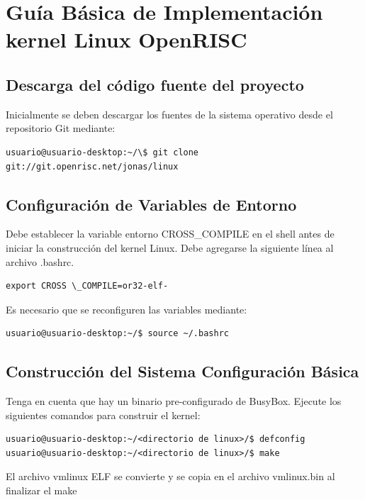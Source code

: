 \chapter{Guía Básica de Implementación kernel Linux OpenRISC} \label{app:apendice5}

\section{Descarga del código fuente del proyecto}

Inicialmente se deben descargar los fuentes de la sistema operativo desde el repositorio Git mediante:

\begin{lstlisting}[breaklines]
 usuario@usuario-desktop:~/\$ git clone git://git.openrisc.net/jonas/linux
\end{lstlisting}


\section{Configuración de Variables de Entorno}

Debe establecer la variable entorno CROSS\_COMPILE en el shell antes de iniciar la construcción del kernel Linux. Debe agregarse la siguiente línea al archivo .bashrc.

\begin{lstlisting}[breaklines]
export CROSS \_COMPILE=or32-elf-
\end{lstlisting}

Es necesario que se reconfiguren las variables mediante:
\begin{lstlisting}[breaklines]
 usuario@usuario-desktop:~/$ source ~/.bashrc
\end{lstlisting}

\section{Construcción del Sistema Configuración Básica}

Tenga en cuenta que hay un binario pre-configurado de BusyBox. Ejecute los siguientes comandos para construir el kernel:


\begin{lstlisting}[breaklines]
usuario@usuario-desktop:~/<directorio de linux>/$ defconfig
usuario@usuario-desktop:~/<directorio de linux>/$ make
\end{lstlisting}

El archivo vmlinux ELF se convierte y se copia en el archivo vmlinux.bin al finalizar el make

